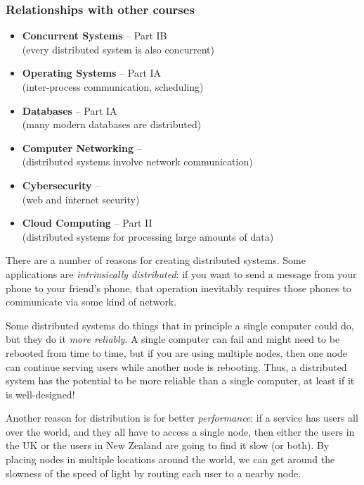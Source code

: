 \begin{frame}
    \label{s:other-courses}
    \frametitle{Relationships with other courses}
    \begin{itemize}
        \item \textbf{Concurrent Systems} -- Part IB\\
            (every distributed system is also concurrent)
        \item \textbf{Operating Systems} -- Part IA\\
            (inter-process communication, scheduling)
        \item \textbf{Databases} -- Part IA\\
            (many modern databases are distributed)
        \item \textbf{Computer Networking} -- \whenisnetworking\\
            (distributed systems involve network communication)
        \item \textbf{Cybersecurity} -- \whenissecurity\\
            (web and internet security)
        \item \textbf{Cloud Computing} -- Part II\\
            (distributed systems for processing large amounts of data)
    \end{itemize}
\end{frame}
\label{l:other-courses}

There are a number of reasons for creating distributed systems.
Some applications are \emph{intrinsically distributed}: if you want to send a message from your phone to your friend's phone, that operation inevitably requires those phones to communicate via some kind of network.

Some distributed systems do things that in principle a single computer could do, but they do it \emph{more reliably}.
A single computer can fail and might need to be rebooted from time to time, but if you are using multiple nodes, then one node can continue serving users while another node is rebooting.
Thus, a distributed system has the potential to be more reliable than a single computer, at least if it is well-designed!

Another reason for distribution is for better \emph{performance}: if a service has users all over the world, and they all have to access a single node, then either the users in the UK or the users in New Zealand are going to find it slow (or both).
By placing nodes in multiple locations around the world, we can get around the slowness of the speed of light by routing each user to a nearby node.

